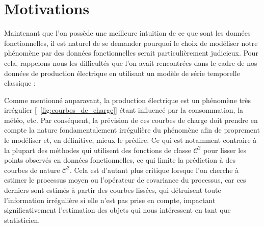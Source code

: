 \chapter{Motivations}
\minitoc%



\smallskip



\bigskip

\noindent
{}



\pagebreak



\pagebreak


Maintenant que l'on possède une meilleure intuition de ce que sont les données fonctionnelles, il est naturel de se demander pourquoi le choix de modéliser notre phénomène par des données fonctionnelles serait particulièrement judicieux. Pour cela, rappelons nous les difficultés que l'on avait rencontrées dans le cadre de nos données de production électrique en utilisant un modèle de série temporelle classique :




Comme mentionné auparavant, la production électrique est un phénomène très irrégulier [~\ref{fig:courbes_de_charge}] étant influencé par la consommation, la météo, etc. Par conséquent, la prévision de ces courbes de charge doit prendre en compte la nature fondamentalement irrégulière du phénomène afin de proprement le modéliser et, en définitive, mieux le prédire. Ce qui est notamment contraire à la plupart des méthodes qui utilisent des fonctions de classe $\mathcal C^2$ pour lisser les points observés en données fonctionnelles, ce qui limite la prédiction à des courbes de nature $\mathcal C^2$. Cela est d'autant plus critique lorsque l'on cherche à estimer le processus moyen ou l'opérateur de covariance du processus, car ces derniers sont estimés à partir des courbes lissées, qui détruisent toute l'information irrégulière si elle n'est pas prise en compte, impactant significativement l'estimation des objets qui nous intéressent en tant que statisticien.


